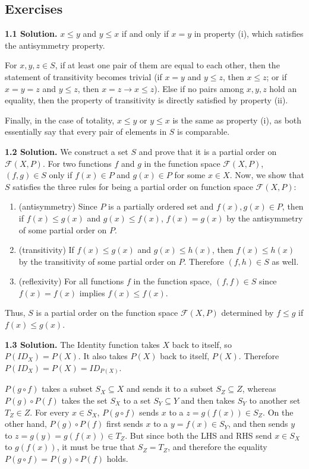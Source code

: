 \subsection{Exercises}
\textbf{1.1 Solution.} $x\leq y$ and $y\leq x$ if and only if $x=y$ in property (i), which satisfies the antisymmetry property. 

For $x,y,z\in S$, if at least one pair of them are equal to each other, then the statement of transitivity becomes trivial (if $x=y$ and $y\leq z$, then $x\leq z$; or if $x=y=z$ and $y\leq z$, then $x=z\rightarrow x\leq z$). Else if no pairs among $x,y,z$ hold an equality, then the property of transitivity is directly satisfied by property (ii). 

Finally, in the case of totality, $x\leq y$ or $y\leq x$ is the same as property (i), as both essentially say that every pair of elements in $S$ is comparable.

\textbf{1.2 Solution.} We construct a set $S$ and prove that it is a partial order on $\mathcal{F}(X,P)$. For two functions $f$ and $g$ in the function space $\mathcal{F}(X,P)$, $(f,g)\in S$ only if $f(x)\in P$ and $g(x)\in P$ for some $x\in X$. Now, we show that $S$ satisfies the three rules for being a partial order on function space $\mathcal{F}(X,P)$:
\begin{enumerate}
    \item (antisymmetry) Since $P$ is a partially ordered set and $f(x),g(x)\in P$, then if $f(x)\leq g(x)$ and $g(x)\leq f(x)$, $f(x)=g(x)$ by the antisymmetry of some partial order on $P$.
    \item (transitivity) If $f(x)\leq g(x)$ and $g(x)\leq h(x)$, then $f(x)\leq h(x)$ by the transitivity of some partial order on $P$. Therefore $(f,h)\in S$ as well.
    \item (reflexivity) For all functions $f$ in the function space, $(f,f)\in S$ since $f(x)=f(x)$ implies $f(x)\leq f(x)$.
\end{enumerate}
Thus, $S$ is a partial order on the function space $\mathcal{F}(X,P)$ determined by $f\leq g$ if $f(x)\leq g(x)$.

\textbf{1.3 Solution.} The Identity function takes $X$ back to itself, so $P(ID_X)=P(X)$. It also takes $P(X)$ back to itself, $P(X)$. Therefore $P(ID_X)=P(X)=ID_{P(X)}$. 

$P(g\circ f)$ takes a subset $S_X\subseteq X$ and sends it to a subset $S_Z\subseteq Z$, whereas $P(g)\circ P(f)$ takes the set $S_X$ to a set $S_Y\subseteq Y$ and then takes $S_Y$ to another set $T_Z\in Z$. For every $x\in S_X$, $P(g\circ f)$ sends $x$ to a $z=g(f(x))\in S_Z$. On the other hand, $P(g)\circ P(f)$ first sends $x$ to a $y=f(x)\in S_Y$, and then sends $y$ to $z=g(y)=g(f(x))\in T_Z$. But since both the LHS and RHS send $x\in S_X$ to $g(f(x))$, it must be true that $S_Z=T_Z$, and therefore the equality $P(g\circ f)=P(g)\circ P(f)$ holds.

